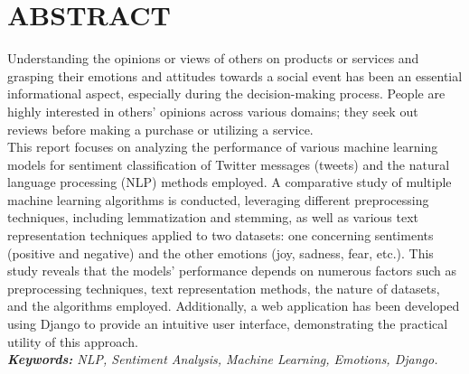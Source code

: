 \newpage
\chapter*{ABSTRACT}
Understanding the opinions or views of others on products or services and grasping their emotions and attitudes towards a social event has been an essential informational aspect, especially during the decision-making process.  People are highly interested in others' opinions across various domains; they seek out reviews before making a purchase or utilizing a service. \\
This report focuses on analyzing the performance of various machine learning models for sentiment classification of Twitter messages (tweets) and the natural language processing (NLP) methods employed. A comparative study of multiple machine learning algorithms is conducted, leveraging different preprocessing techniques, including lemmatization and stemming, as well as various text representation techniques applied to two datasets: one concerning sentiments (positive and negative) and the other emotions (joy, sadness, fear, etc.). This study reveals that the models' performance depends on numerous factors such as preprocessing techniques, text representation methods, the nature of datasets, and the algorithms employed. Additionally, a web application has been developed using Django to provide an intuitive user interface, demonstrating the practical utility of this approach.\\
\emph{{\textbf{Keywords:}} NLP, Sentiment Analysis, Machine Learning, Emotions, Django.}